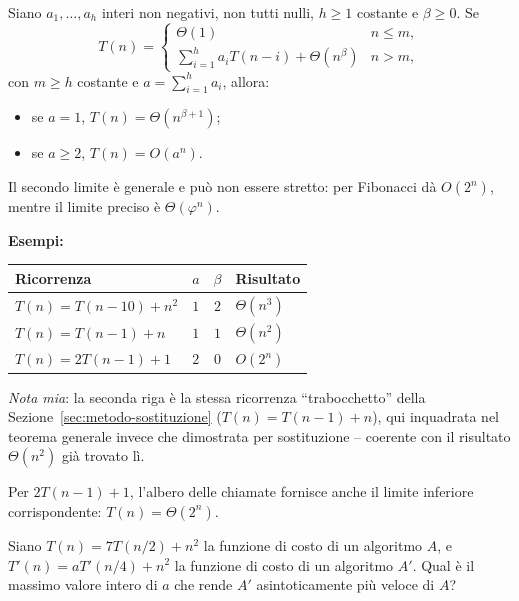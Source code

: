\documentclass[12pt, a4paper]{article}
\begin{document}
\begin{tcolorbox}[colback=lightergray!10, colframe=tocsec, title=\textbf{Teorema (Ricorrenze Lineari di Ordine Costante)}]
\label{teo:ricorrenze-lineari}
Siano $a_1,\ldots,a_h$ interi non negativi, non tutti nulli, $h\ge 1$ costante e $\beta\ge 0$. Se
$$T(n) = \begin{cases} \Theta(1) & n\le m, \\ \displaystyle\sum_{i=1}^h a_i T(n-i) + \Theta(n^\beta) & n>m, \end{cases}$$
con $m\ge h$ costante e $a=\sum_{i=1}^h a_i$, allora:
\begin{itemize}
    \item se $a=1$, $T(n)=\Theta(n^{\beta+1})$;
    \item se $a\ge 2$, $T(n)=O(a^n)$.
\end{itemize}
Il secondo limite è generale e può non essere stretto: per Fibonacci dà $O(2^n)$, mentre il limite preciso è $\Theta(\varphi^n)$.
\end{tcolorbox}

\textbf{Esempi:}
\begin{center}
\begin{tabular}{lccl}
\toprule
\textbf{Ricorrenza} & $a$ & $\beta$ & \textbf{Risultato} \\
\midrule
$T(n)=T(n-10)+n^2$ & $1$ & $2$ & $\Theta(n^3)$ \\
$T(n)=T(n-1)+n$ & $1$ & $1$ & $\Theta(n^2)$ \\
$T(n)=2T(n-1)+1$ & $2$ & $0$ & $O(2^n)$ \\
\bottomrule
\end{tabular}
\end{center}
\textit{Nota mia}: la seconda riga è la stessa ricorrenza ``trabocchetto'' della Sezione~\ref{sec:metodo-sostituzione} ($T(n)=T(n-1)+n$), qui inquadrata nel teorema generale invece che dimostrata per sostituzione -- coerente con il risultato $\Theta(n^2)$ già trovato lì.

Per $2T(n-1)+1$, l'albero delle chiamate fornisce anche il limite inferiore corrispondente: $T(n)=\Theta(2^n)$.

\begin{tcolorbox}[colback=lightergray!10, colframe=tocsec, title=\textbf{Esercizio}]
Siano $T(n)=7T(n/2)+n^2$ la funzione di costo di un algoritmo $A$, e $T'(n)=aT'(n/4)+n^2$ la funzione di costo di un algoritmo $A'$. Qual è il massimo valore intero di $a$ che rende $A'$ asintoticamente più veloce di $A$?
\end{tcolorbox}
\end{document}
